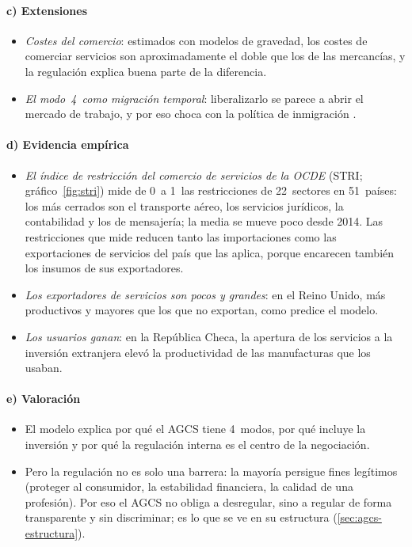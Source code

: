 \documentclass[11pt]{article}
\begin{document}
\paragraph{c) Extensiones}

\begin{itemize}
\item \emph{Costes del comercio}: estimados con modelos de gravedad, los costes de comerciar servicios son aproximadamente el doble que los de las mercancías, y la regulación explica buena parte de la diferencia\nocite{OMC2019InformeServicios,BenzJaax2022Costs}.
\item \emph{El modo~4~como migración temporal}: liberalizarlo se parece a abrir el mercado de trabajo, y por eso choca con la política de inmigración .
\end{itemize}

\paragraph{d) Evidencia empírica}

\begin{itemize}
\item \emph{El índice de restricción del comercio de servicios de la OCDE} (STRI; gráfico~\ref{fig:stri}) mide de 0~a 1~las restricciones de 22~sectores en 51~países: los más cerrados son el transporte aéreo, los servicios jurídicos, la contabilidad y los de mensajería; la media se mueve poco desde 2014\nocite{OCDE2026STRI}. Las restricciones que mide reducen tanto las importaciones como las exportaciones de servicios del país que las aplica, porque encarecen también los insumos de sus exportadores\nocite{NordasRouzet2017Impact}.
\item \emph{Los exportadores de servicios son pocos y grandes}: en el Reino Unido, más productivos y mayores que los que no exportan, como predice el modelo\nocite{BreinlichCriscuolo2011International}.
\item \emph{Los usuarios ganan}: en la República Checa, la apertura de los servicios a la inversión extranjera elevó la productividad de las manufacturas que los usaban\nocite{ArnoldJavorcikMattoo2011Does}.
\end{itemize}


\paragraph{e) Valoración}

\begin{itemize}
\item El modelo explica por qué el AGCS tiene 4~modos, por qué incluye la inversión y por qué la regulación interna es el centro de la negociación.
\item Pero la regulación no es solo una barrera: la mayoría persigue fines legítimos (proteger al consumidor, la estabilidad financiera, la calidad de una profesión). Por eso el AGCS no obliga a desregular, sino a regular de forma transparente y sin discriminar; es lo que se ve en su estructura (\ref{sec:agcs-estructura}).
\end{itemize}
\end{document}
